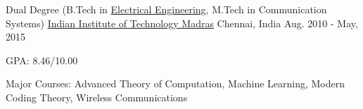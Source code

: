 \begin{cventries}
	\cventry
	{Dual Degree (B.Tech in \href{http://www.ee.iitm.ac.in/}{Electrical Engineering}, M.Tech in Communication Systems)}
	{\href{https://www.iitm.ac.in/}{Indian Institute of Technology Madras}}
	{Chennai, India}
	{Aug. 2010 - May, 2015}
	{
		\begin{cvitems}
		\item{GPA: 8.46/10.00}
		\item{Major Courses: Advanced Theory of Computation, Machine Learning, Modern Coding Theory, Wireless Communications}
		\end{cvitems}
	}

\end{cventries}
